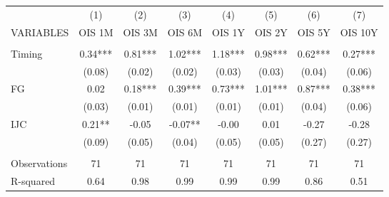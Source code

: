 \begin{tabular}{lccccccc} \hline
 & (1) & (2) & (3) & (4) & (5) & (6) & (7) \\
VARIABLES & OIS 1M & OIS 3M & OIS 6M & OIS 1Y & OIS 2Y & OIS 5Y & OIS 10Y \\ \hline
 &  &  &  &  &  &  &  \\
Timing & 0.34*** & 0.81*** & 1.02*** & 1.18*** & 0.98*** & 0.62*** & 0.27*** \\
 & (0.08) & (0.02) & (0.02) & (0.03) & (0.03) & (0.04) & (0.06) \\
FG & 0.02 & 0.18*** & 0.39*** & 0.73*** & 1.01*** & 0.87*** & 0.38*** \\
 & (0.03) & (0.01) & (0.01) & (0.01) & (0.01) & (0.04) & (0.06) \\
IJC & 0.21** & -0.05 & -0.07** & -0.00 & 0.01 & -0.27 & -0.28 \\
 & (0.09) & (0.05) & (0.04) & (0.05) & (0.05) & (0.27) & (0.27) \\
 &  &  &  &  &  &  &  \\
Observations & 71 & 71 & 71 & 71 & 71 & 71 & 71 \\
 R-squared & 0.64 & 0.98 & 0.99 & 0.99 & 0.99 & 0.86 & 0.51 \\ \hline
\end{tabular}
